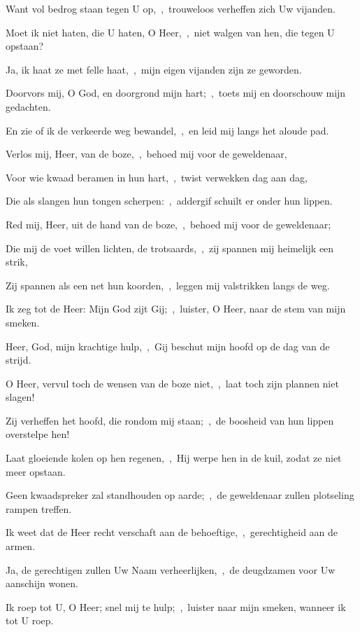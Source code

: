 \documentclass[12pt,twoside,a5paper]{article}
\begin{document}
\begin{halfparskip}
  Want vol bedrog staan tegen U op,~\sep\ trouweloos verheffen zich Uw vijanden.

  Moet ik niet haten, die U haten, O Heer,~\sep\ niet walgen van hen, die tegen U opstaan?

  Ja, ik haat ze met felle haat,~\sep\ mijn eigen vijanden zijn ze geworden.

  Doorvors mij, O God, en doorgrond mijn hart;~\sep\ toets mij en doorschouw mijn gedachten.

  En zie of ik de verkeerde weg bewandel,~\sep\ en leid mij langs het aloude pad.

   Verlos mij, Heer, van de boze,~\sep\ behoed mij voor de geweldenaar,

  Voor wie kwaad beramen in hun hart,~\sep\ twist verwekken dag aan dag,

  Die als slangen hun tongen scherpen:~\sep\ addergif schuilt er onder hun lippen.

  Red mij, Heer, uit de hand van de boze,~\sep\ behoed mij voor de geweldenaar;

  Die mij de voet willen lichten, de trotsaards,~\sep\ zij spannen mij heimelijk een strik,

  Zij spannen als een net hun koorden,~\sep\ leggen mij valstrikken langs de weg.

  Ik zeg tot de Heer: Mijn God zijt Gij;~\sep\ luister, O Heer, naar de stem van mijn smeken.

  Heer, God, mijn krachtige hulp,~\sep\ Gij beschut mijn hoofd op de dag van de strijd.

  O Heer, vervul toch de wensen van de boze niet,~\sep\ laat toch zijn plannen niet slagen!

  Zij verheffen het hoofd, die rondom mij staan;~\sep\ de boosheid van hun lippen overstelpe hen!

  Laat gloeiende kolen op hen regenen,~\sep\ Hij werpe hen in de kuil, zodat ze niet meer opstaan.

  Geen kwaadspreker zal standhouden op aarde;~\sep\ de geweldenaar zullen plotseling rampen treffen.

  Ik weet dat de Heer recht verschaft aan de behoeftige,~\sep\ gerechtigheid aan de armen.

  Ja, de gerechtigen zullen Uw Naam verheerlijken,~\sep\ de deugdzamen voor Uw aanschijn wonen.

   Ik roep tot U, O Heer; snel mij te hulp;~\sep\ luister naar mijn smeken, wanneer ik tot U roep.


\end{halfparskip}
\end{document}
